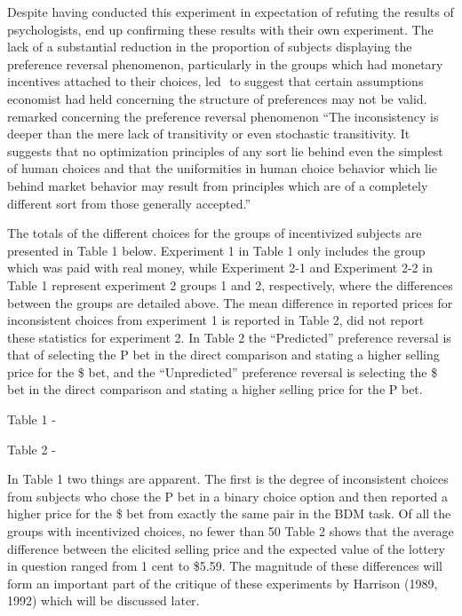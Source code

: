 Despite having conducted this experiment in expectation of refuting the results of psychologists, \textcite{Grether1979} end up confirming these results with their own experiment.
The lack of a substantial reduction in the proportion of subjects displaying the preference reversal phenomenon, particularly in the groups which had monetary incentives attached to their choices, led \textcite{Grether1979}⁠ to suggest that certain assumptions economist had held concerning the structure of preferences may not be valid.
\textcite[623]{Grether1979} remarked concerning the preference reversal phenomenon \enquote{The inconsistency is deeper than the mere lack of transitivity or even stochastic transitivity.
It suggests that no optimization principles of any sort lie behind even the simplest of human choices and that the uniformities in human choice behavior which lie behind market behavior may result from principles which are of a completely different sort from those generally accepted.} 

The totals of the different choices for the groups of incentivized subjects are presented in Table 1 below.
Experiment 1 in Table 1 only includes the group which was paid with real money, while Experiment 2-1 and Experiment 2-2 in Table 1 represent experiment 2 groups 1 and 2, respectively,  where the differences between the groups are detailed above.
The mean difference in reported prices for inconsistent choices from experiment 1 is reported in Table 2, \textcite{Grether1979} did not report these statistics for experiment 2.
In Table 2 the \enquote{Predicted} preference reversal is that of selecting the P bet in the direct comparison and stating a higher selling price for the \$ bet, and the \enquote{Unpredicted} preference reversal is selecting the \$ bet in the direct comparison and stating a higher selling price for the P bet.

Table 1 - \textcite{Grether1979} 





Table 2 - \textcite{Grether1979}


In Table 1 two things are apparent.
The first is the degree of inconsistent choices from subjects who chose the P bet in a binary choice option and then reported a higher price for the \$ bet from exactly the same pair in the BDM task.
Of all the groups with incentivized choices, no fewer than 50%
Table 2 shows that the average difference between the elicited selling price and the expected value of the lottery in question ranged from 1 cent to \$5.59.
The magnitude of these differences will form an important part of the critique of these experiments by Harrison (1989, 1992)⁠ which will be discussed later.

